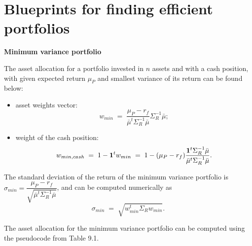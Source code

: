 
\section{Blueprints for finding efficient portfolios}

\noindent\textbf{Minimum variance portfolio}

The asset allocation for a portfolio invested in $n$ assets and with a cash position,
with given expected return $\mu_P$ and smallest variance of its return can be found
below:
\begin{itemize}
\item asset weights vector:
\begin{equation}
w_{min} \;=\; \frac{\mu_P-r_f}{\bar\mu^t\Sigma_R^{-1}\bar\mu}\Sigma_R^{-1}\bar\mu;
\end{equation}
\item weight of the cash position:
\begin{equation}
w_{min,cash} \;=\; 1-\mathbf{1}^tw_{min} \;=\;
1-(\mu_P-r_f)\frac{\mathbf{1}^t\Sigma_R^{-1}\bar\mu}{\bar\mu^t\Sigma_R^{-1}\bar\mu}.
\end{equation}
\end{itemize}

The standard deviation of the return of the minimum variance portfolio is $\sigma_{min}
= \dfrac{\mu_P-r_f}{\sqrt{\bar\mu^t\Sigma_R^{-1}\bar\mu}}$, and can be computed
numerically as
\[
\sigma_{min} \;=\; \sqrt{w_{min}^t\Sigma_Rw_{min}}.
\]

The asset allocation for the minimum variance portfolio can be computed using the
pseudocode from Table 9.1.

